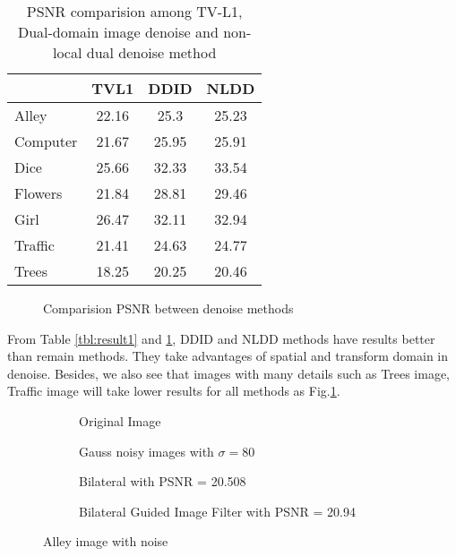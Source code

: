 \begin{table}[ht]
	\centering
	\caption{PSNR comparision among TV-L1, Dual-domain image denoise and non-local dual denoise method}
	\label{tbl:result2}
	\begin{tabular}{|l|c|c|c|}
		\hline
		& \cellcolor[HTML]{C0C0C0}\textbf{TVL1} 
		& \cellcolor[HTML]{C0C0C0}\textbf{DDID} 
		& \cellcolor[HTML]{C0C0C0}\textbf{NLDD} \\
		\hline
		Alley &22.16 &25.3 &25.23 \\ \hline
		Computer &21.67 &25.95 &25.91 \\ \hline
		Dice &25.66 &32.33 &33.54 \\ \hline
		Flowers &21.84 &28.81 &29.46 \\ \hline
		Girl &26.47 &32.11 &32.94 \\ \hline
		Traffic &21.41 &24.63 &24.77 \\ \hline
		Trees &18.25 &20.25 &20.46 \\ \hline
	\end{tabular}
\end{table}

\begin{figure}[ht]
	\caption{Comparision PSNR between denoise methods}
	\label{fig:psnr_method}
\end{figure}

From Table \ref{tbl:result1} and \ref{tbl:result2}, DDID and NLDD methods have results better than remain methods. They take advantages of spatial and transform domain in denoise. 
Besides, we also see that images with many details such as Trees image, Traffic image will take lower results for all methods as Fig.\ref{fig:psnr_method}.

\begin{figure*}[ht]
	\centering
	\begin{subfigure}{0.5\textwidth}
		\caption{Original Image}
		\label{fig:Alley}
	\end{subfigure}%
	\begin{subfigure}{0.5\textwidth}
		\caption{Gauss noisy images with $\sigma = 80$}
		\label{fig:NoisyAlley}
	\end{subfigure}	
	\begin{subfigure}{0.5\textwidth}
		\caption{Bilateral with PSNR = 20.508}
		\label{fig:Alley_80_Bilateral}
	\end{subfigure}%
	\begin{subfigure}{0.5\textwidth}
		\caption{Bilateral Guided Image Filter with PSNR = 20.94}
		\label{fig:Alley_80_BilateralGuided}
	\end{subfigure}	
	\caption{Alley image with noise}
	\label{fig:alley_image}
\end{figure*}

